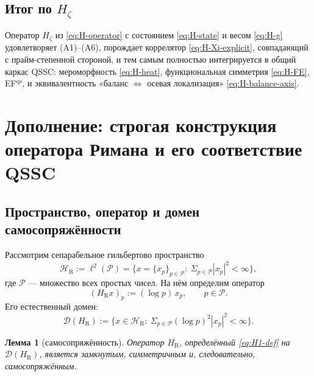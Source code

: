\documentclass{article}
\numberwithin{equation}{section}
\theoremstyle{plain}
\newtheorem{lemma}{Лемма}
\theoremstyle{definition}
\theoremstyle{remark}
\def\Leftrightarrow{⇔}%
\def\infty{∞}\def\partial{∂}\def\sum{Σ}\def\int{∫}%
\begin{document}
\subsection*{Итог по \texorpdfstring{$H_\zeta$}{H\_ζ}}

Оператор \(H_\zeta\) из \eqref{eq:H-operator} с состоянием \eqref{eq:H-state} и весом \eqref{eq:H-g} 
удовлетворяет (A1)–(A6), порождает коррелятор \eqref{eq:H-Xi-explicit}, 
совпадающий с прайм-степенной стороной, и тем самым полностью интегрируется в общий каркас QSSC: 
мероморфность \eqref{eq:H-heat}, функциональная симметрия \eqref{eq:H-FE}, EF\(^{\mathrm{qs}}\), и 
эквивалентность «баланс \(\Leftrightarrow\) осевая локализация» \eqref{eq:H-balance-axis}.

\clearpage

\section{Дополнение: строгая конструкция оператора Римана и его соответствие QSSC}

\subsection*{Пространство, оператор и домен самосопряжённости}

Рассмотрим сепарабельное гильбертово пространство
\begin{equation}\label{eq:H1-space}
\mathcal H_{\mathrm R} := \ell^2(\mathcal P)
=\Big\{x=\{x_p\}_{p\in\mathcal P}:\ 
\sum_{p\in\mathcal P} |x_p|^2 < \infty \Big\},
\end{equation}
где \(\mathcal P\) — множество всех простых чисел.  
На нём определим оператор
\begin{equation}\label{eq:H1-def}
(H_{\mathrm R}x)_p := (\log p)\, x_p,\qquad p\in\mathcal P.
\end{equation}
Его естественный домен:
\begin{equation}\label{eq:H1-domain}
\mathcal D(H_{\mathrm R})
:=\Big\{x\in\mathcal H_{\mathrm R}:\ 
\sum_{p\in\mathcal P} (\log p)^2 |x_p|^2 < \infty \Big\}.
\end{equation}

\begin{lemma}[самосопряжённость]
Оператор \(H_{\mathrm R}\), определённый \eqref{eq:H1-def} на \(\mathcal D(H_{\mathrm R})\),
является замкнутым, симметричным и, следовательно, самосопряжённым.
\end{lemma}
\end{document}
